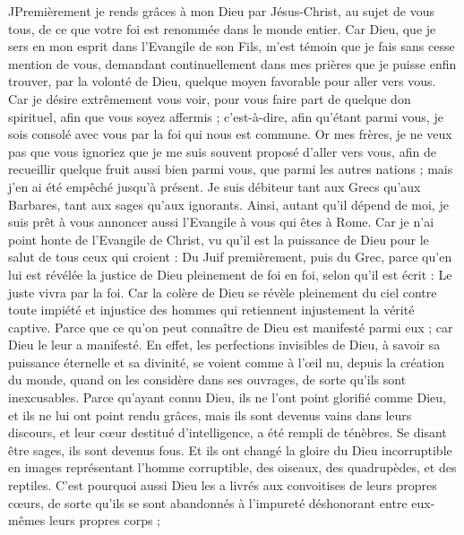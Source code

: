 \begin{multicols}{2}
JPremièrement je rends grâces à mon Dieu par Jésus-Christ, au sujet de vous tous, de ce que votre foi est renommée dans le monde entier.
Car Dieu, que je sers en mon esprit dans l'Evangile de son Fils, m'est témoin que je fais sans cesse mention de vous,
demandant continuellement dans mes prières que je puisse enfin trouver, par la volonté de Dieu, quelque moyen favorable pour aller vers vous.
Car je désire extrêmement vous voir, pour vous faire part de quelque don spirituel, afin que vous soyez affermis ;
c’est-à-dire, afin qu'étant parmi vous, je sois consolé avec vous par la foi qui nous est commune.
Or mes frères, je ne veux pas que vous ignoriez que je me suis souvent proposé d’aller vers vous, afin de recueillir quelque fruit aussi bien parmi vous, que parmi les autres nations ; mais j'en ai été empêché jusqu'à présent.
Je suis débiteur tant aux Grecs qu’aux Barbares, tant aux sages qu’aux ignorants.
Ainsi, autant qu’il dépend de moi, je suis prêt à vous annoncer aussi l'Evangile à vous qui êtes à Rome.
Car je n'ai point honte de l'Evangile de Christ, vu qu'il est la puissance de Dieu pour le salut de tous ceux qui croient : Du Juif premièrement, puis du Grec,
parce qu’en lui est révélée la justice de Dieu pleinement de foi en foi, selon qu'il est écrit : Le juste vivra par la foi.
Car la colère de Dieu se révèle pleinement du ciel contre toute impiété et injustice des hommes qui retiennent injustement la vérité captive.
Parce que ce qu’on peut connaître de Dieu est manifesté parmi eux ; car Dieu le leur a manifesté.
En effet, les perfections invisibles de Dieu, à savoir sa puissance éternelle et sa divinité, se voient comme à l’œil nu, depuis la création du monde, quand on les considère dans ses ouvrages, de sorte qu'ils sont inexcusables.
Parce qu'ayant connu Dieu, ils ne l'ont point glorifié comme Dieu, et ils ne lui ont point rendu grâces, mais ils sont devenus vains dans leurs discours, et leur cœur destitué d’intelligence, a été rempli de ténèbres.
Se disant être sages, ils sont devenus fous.
Et ils ont changé la gloire du Dieu incorruptible en images représentant l'homme corruptible, des oiseaux, des quadrupèdes, et des reptiles.
C’est pourquoi aussi Dieu les a livrés aux convoitises de leurs propres cœurs, de sorte qu’ils se sont abandonnés à l’impureté déshonorant entre eux-mêmes leurs propres corps ;

\end{multicols}

